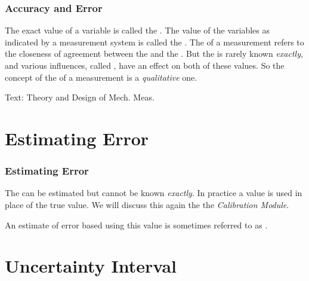 \documentclass[fleqn]{beamer} %
\newcommand{\sectiontitleII}{Accuracy and Error}
\newcommand{\sectiontitleIII}{Estimating Error}
\newcommand{\sectiontitleIV}{Uncertainty Interval}
\begin{document}
\begin{frame}[label=sectionII]
\frametitle{\sectiontitleII}


The exact value of a variable is called the \hspcu \hspcc \hspcu. The value of the variables as indicated by a
measurement system is called the \hspcuu \hspcc \hspcuu. The \hspcuu of a measurement refers to the
closeness of agreement between the \hspcuu \hspcc \hspcuu and the \hspcuu \hspcc \hspcuu. But the \hspcuu \hspcc \hspcuu is rarely
known {\it exactly}, and various influences, called \hspcuu, have an effect on both of these values. So the
concept of the \hspcuu of a measurement is a {\it qualitative} one. \vspcc

\begin{framed}\end{framed}

\vspace{0mm}
{\tiny Text: Theory and Design of Mech. Meas.}
\end{frame}

\section{\sectiontitleIII}

\begin{frame}[label=sectionIII]
\frametitle{\sectiontitleIII}

The \hspcuu \hspcc \hspcuu can be estimated but cannot be known  {\it exactly}. In practice a \hspcu value is used in place of the true value. We will discuss this again the the {\it Calibration Module}.


\begin{framed}\end{framed}

An estimate of error based using this value is sometimes referred to as \hspcuu \hspcc \hspcuu. \vspc

\end{frame}

\section{\sectiontitleIV}
\end{document}
